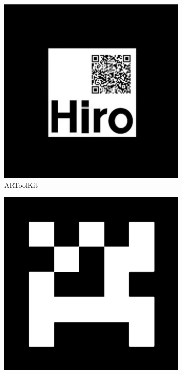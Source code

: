 \begin{figure}[H]
    \centering
    \begin{subfigure}[b]{0.25\textwidth}
        \centering
        \includegraphics[width=\textwidth]{ch1/figs/ARToolkit.jpg}
        \caption{ARToolKit}
        \label{fig:artoolkit}
    \end{subfigure}
    \hfill
    \begin{subfigure}[b]{0.25\textwidth}
        \centering
        \includegraphics[width=\textwidth]{ch1/figs/AprilTag.png}

\end{subfigure}
\end{figure}
